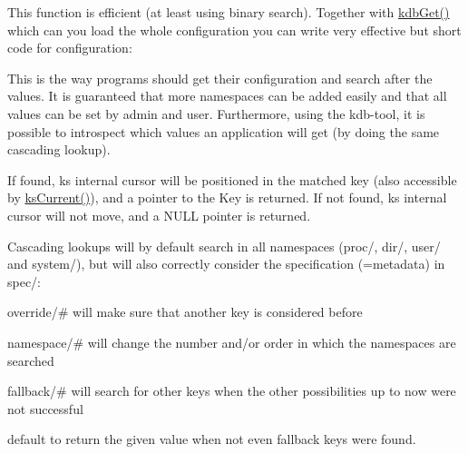 This function is efficient (at least using binary search). Together with \hyperlink{group__kdb_ga28e385fd9cb7ccfe0b2f1ed2f62453a1}{kdb\+Get()} which can you load the whole configuration you can write very effective but short code for configuration\+:


 This is the way programs should get their configuration and search after the values. It is guaranteed that more namespaces can be added easily and that all values can be set by admin and user. Furthermore, using the kdb-\/tool, it is possible to introspect which values an application will get (by doing the same cascading lookup).

If found, {\ttfamily ks} internal cursor will be positioned in the matched key (also accessible by \hyperlink{group__keyset_ga4287b9416912c5f2ab9c195cb74fb094}{ks\+Current()}), and a pointer to the Key is returned. If not found, {\ttfamily ks} internal cursor will not move, and a N\+U\+LL pointer is returned.

Cascading lookups will by default search in all namespaces (proc/, dir/, user/ and system/), but will also correctly consider the specification (=metadata) in spec/\+:


\begin{DoxyItemize}
\item {\ttfamily override/\#} will make sure that another key is considered before
\item {\ttfamily namespace/\#} will change the number and/or order in which the namespaces are searched
\item {\ttfamily fallback/\#} will search for other keys when the other possibilities up to now were not successful
\item {\ttfamily default} to return the given value when not even {\ttfamily fallback} keys were found.
\end{DoxyItemize}

